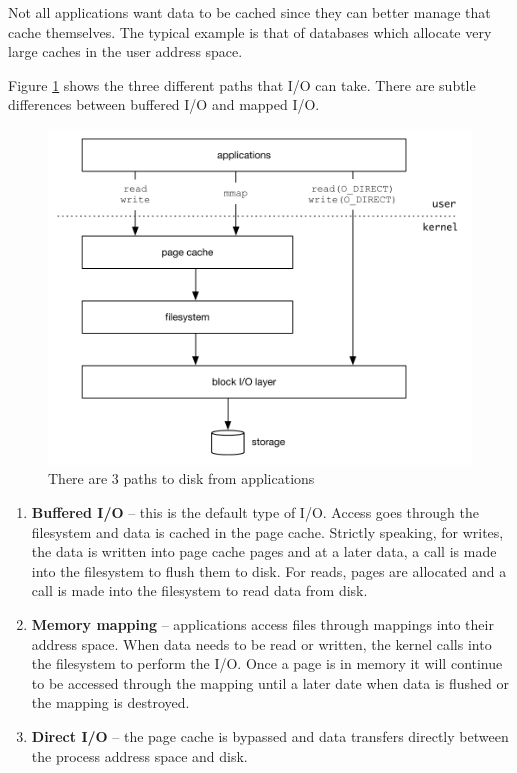 Not all applications want data to be cached since they can better manage that cache themselves. The typical example is that of databases which allocate very large caches in the user address space.

Figure \ref{fig:direct-io} shows the three different paths that I/O can take. There are subtle differences between buffered I/O and mapped I/O.

\begin{figure}
	\includegraphics[scale=0.6]{figures/direct-io.pdf}
	\centering
	\caption{There are 3 paths to disk from applications}
	\label{fig:direct-io}
\end{figure}

\begin{enumerate}
	\item \textbf{Buffered I/O} -- this is the default type of I/O. Access goes through the filesystem and data is cached in
		the page cache. Strictly speaking, for writes, the data is written into page cache pages and at a later data, a call
		is made into the filesystem to flush them to disk. For reads, pages are allocated and a call is made into the 
		filesystem to read data from disk.
	\item \textbf{Memory mapping} -- applications access files through mappings into their address space. When data needs
		to be read or written, the kernel calls into the filesystem to perform the I/O. Once a page is in memory it will
		continue to be accessed through the mapping until a later date when data is flushed or the mapping is destroyed.
	\item \textbf{Direct I/O} -- the page cache is bypassed and data transfers directly between the process address space
		and disk.
\end{enumerate}

